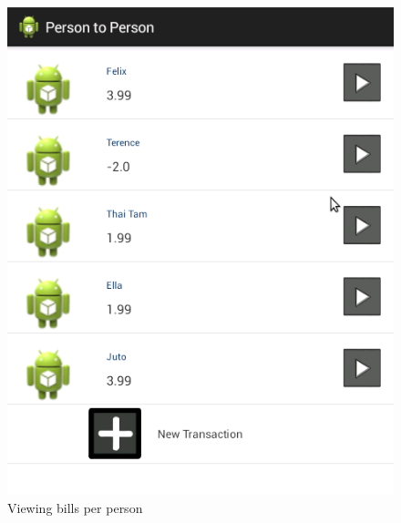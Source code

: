 \documentclass[a4paper,11pt]{article}
\begin{document}
\begin{figure}[ht]
\begin{center}
\advance\leftskip-3cm
\advance\rightskip-3cm
\includegraphics[keepaspectratio=true,scale=0.5]{perPerson}
\caption{Viewing bills per person}
\label{visina8}
\end{center}
\end{figure}
\end{document}
